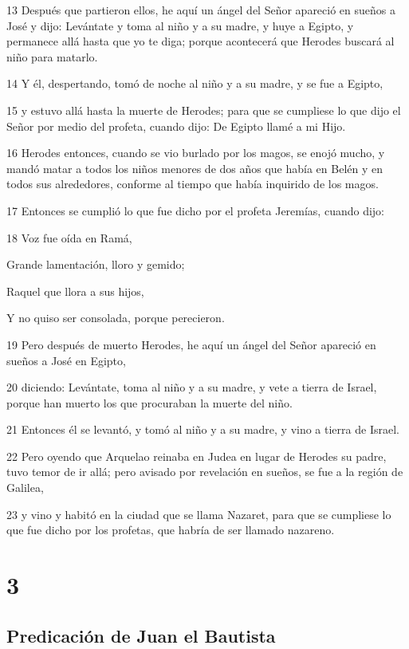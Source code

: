 \par 13 Después que partieron ellos, he aquí un ángel del Señor apareció en sueños a José y dijo: Levántate y toma al niño y a su madre, y huye a Egipto, y permanece allá hasta que yo te diga; porque acontecerá que Herodes buscará al niño para matarlo.
\par 14 Y él, despertando, tomó de noche al niño y a su madre, y se fue a Egipto,
\par 15 y estuvo allá hasta la muerte de Herodes; para que se cumpliese lo que dijo el Señor por medio del profeta, cuando dijo: De Egipto llamé a mi Hijo.
\par 16 Herodes entonces, cuando se vio burlado por los magos, se enojó mucho, y mandó matar a todos los niños menores de dos años que había en Belén y en todos sus alrededores, conforme al tiempo que había inquirido de los magos.
\par 17 Entonces se cumplió lo que fue dicho por el profeta Jeremías, cuando dijo:
\par 18 Voz fue oída en Ramá,
\par Grande lamentación, lloro y gemido;
\par Raquel que llora a sus hijos,
\par Y no quiso ser consolada, porque perecieron.
\par 19 Pero después de muerto Herodes, he aquí un ángel del Señor apareció en sueños a José en Egipto,
\par 20 diciendo: Levántate, toma al niño y a su madre, y vete a tierra de Israel, porque han muerto los que procuraban la muerte del niño.
\par 21 Entonces él se levantó, y tomó al niño y a su madre, y vino a tierra de Israel.
\par 22 Pero oyendo que Arquelao reinaba en Judea en lugar de Herodes su padre, tuvo temor de ir allá; pero avisado por revelación en sueños, se fue a la región de Galilea,
\par 23 y vino y habitó en la ciudad que se llama Nazaret, para que se cumpliese lo que fue dicho por los profetas, que habría de ser llamado nazareno.

\chapter{3}

\section*{Predicación de Juan el Bautista}

